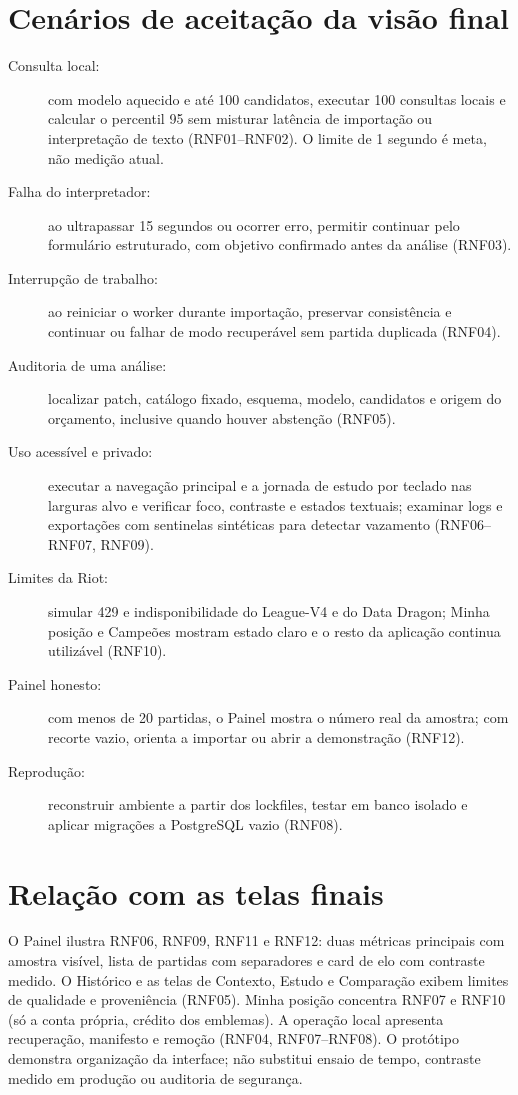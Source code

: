 \documentclass[12pt,a4paper]{article}
\begin{document}
\section{Cenários de aceitação da visão final}
\begin{description}
  \item[Consulta local:] com modelo aquecido e até 100 candidatos, executar 100 consultas
  locais e calcular o percentil 95 sem misturar latência de importação ou interpretação
  de texto (RNF01--RNF02). O limite de 1 segundo é meta, não medição atual.
  \item[Falha do interpretador:] ao ultrapassar 15 segundos ou ocorrer erro, permitir
  continuar pelo formulário estruturado, com objetivo confirmado antes da análise
  (RNF03).
  \item[Interrupção de trabalho:] ao reiniciar o worker durante importação, preservar
  consistência e continuar ou falhar de modo recuperável sem partida duplicada
  (RNF04).
  \item[Auditoria de uma análise:] localizar patch, catálogo fixado, esquema, modelo,
  candidatos e origem do orçamento, inclusive quando houver abstenção (RNF05).
  \item[Uso acessível e privado:] executar a navegação principal e a jornada de estudo por
  teclado nas larguras alvo e verificar foco, contraste e estados textuais; examinar logs e
  exportações com sentinelas sintéticas para detectar vazamento (RNF06--RNF07, RNF09).
  \item[Limites da Riot:] simular 429 e indisponibilidade do League-V4 e do Data Dragon;
  Minha posição e Campeões mostram estado claro e o resto da aplicação continua
  utilizável (RNF10).
  \item[Painel honesto:] com menos de 20 partidas, o Painel mostra o número real da amostra;
  com recorte vazio, orienta a importar ou abrir a demonstração (RNF12).
  \item[Reprodução:] reconstruir ambiente a partir dos lockfiles, testar em banco
  isolado e aplicar migrações a PostgreSQL vazio (RNF08).
\end{description}

\section{Relação com as telas finais}
O Painel ilustra RNF06, RNF09, RNF11 e RNF12: duas métricas principais com amostra visível,
lista de partidas com separadores e card de elo com contraste medido. O Histórico e as telas
de Contexto, Estudo e Comparação exibem limites de qualidade e proveniência (RNF05). Minha
posição concentra RNF07 e RNF10 (só a conta própria, crédito dos emblemas). A operação local
apresenta recuperação, manifesto e remoção (RNF04, RNF07--RNF08). O protótipo demonstra
organização da interface; não substitui ensaio de tempo, contraste medido em produção ou
auditoria de segurança.
\end{document}
